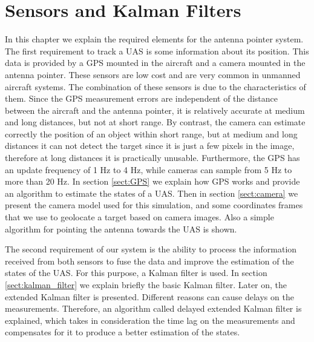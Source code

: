 \chapter{Sensors and Kalman Filters}{\label{ch:Sensors}}
In this chapter we explain the required elements for the antenna pointer system. The first requirement to track a UAS is some information about its position. This data is provided by a GPS mounted in the aircraft and a camera mounted in the antenna pointer. These sensors are low cost and are very common in unmanned aircraft systems. The combination of these sensors is due to the characteristics of them. Since the GPS measurement errors are independent of the distance between the aircraft and the antenna pointer, it is relatively accurate at medium and long distances, but not at short range. By contrast, the camera can estimate correctly the position of an object within short range, but at medium and long distances it can not detect the target since it is just a few pixels in the image, therefore at long distances it is practically unusable. Furthermore, the GPS has an update frequency of 1 Hz to 4 Hz, while cameras can sample from 5 Hz to more than 20 Hz. In section \ref{sect:GPS} we explain how GPS works and provide an algorithm to estimate the states of a UAS. Then in section \ref{sect:camera} we present the camera model used for this simulation, and some coordinates frames that we use to geolocate a target based on camera images. Also a simple algorithm for pointing the antenna towards the UAS is shown.

The second requirement of our system is the ability to process the information received from both sensors to fuse the data and improve the estimation of the states of the UAS. For this purpose, a Kalman filter is used. In section \ref{sect:kalman_filter} we explain briefly the basic Kalman filter. Later on, the extended Kalman filter is presented. Different reasons can cause delays on the measurements. Therefore, an algorithm called delayed extended Kalman filter is explained, which takes in consideration the time lag on the measurements and compensates for it to produce a better estimation of the states.

\pagebreak

